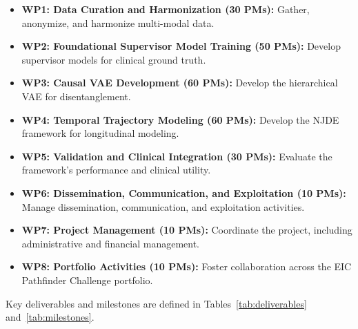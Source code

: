 \documentclass[11pt, a4paper]{article}
\begin{document}
\begin{itemize}
    \item \textbf{WP1: Data Curation and Harmonization (30 PMs):} Gather, anonymize, and harmonize multi-modal data.
    \item \textbf{WP2: Foundational Supervisor Model Training (50 PMs):} Develop supervisor models for clinical ground truth.
    \item \textbf{WP3: Causal VAE Development (60 PMs):} Develop the hierarchical VAE for disentanglement.
    \item \textbf{WP4: Temporal Trajectory Modeling (60 PMs):} Develop the NJDE framework for longitudinal modeling.
    \item \textbf{WP5: Validation and Clinical Integration (30 PMs):} Evaluate the framework's performance and clinical utility.
    \item \textbf{WP6: Dissemination, Communication, and Exploitation (10 PMs):} Manage dissemination, communication, and exploitation activities.
    \item \textbf{WP7: Project Management (10 PMs):} Coordinate the project, including administrative and financial management.
    \item \textbf{WP8: Portfolio Activities (10 PMs):} Foster collaboration across the EIC Pathfinder Challenge portfolio.
\end{itemize}

Key deliverables and milestones are defined in Tables~\ref{tab:deliverables} and~\ref{tab:milestones}.
\end{document}
